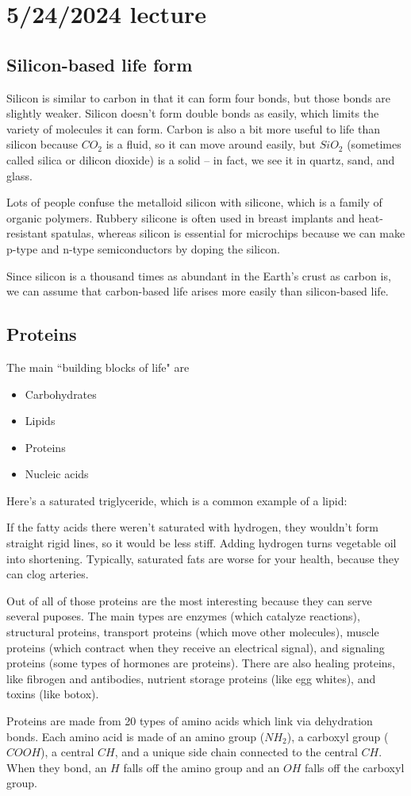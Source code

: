 \documentclass[class=article, crop=false]{standalone}
\begin{document}
\section{5/24/2024 lecture}
\subsection{Silicon-based life form}
Silicon is similar to carbon in that it can form four bonds, but those bonds are slightly weaker. Silicon doesn't form double bonds as easily, which limits the variety of molecules it can form. Carbon is also a bit more useful to life than silicon because $CO_2$ is a fluid, so it can move around easily, but $SiO_2$ (sometimes called silica or dilicon dioxide) is a solid -- in fact, we see it in quartz, sand, and glass.
\begin{note}
    Lots of people confuse the metalloid silicon with silicone, which is a family of organic polymers. Rubbery silicone is often used in breast implants and heat-resistant spatulas, whereas silicon is essential for microchips because we can make p-type and n-type semiconductors by doping the silicon.
\end{note}
\par
Since silicon is a thousand times as abundant in the Earth's crust as carbon is, we can assume that carbon-based life arises more easily than silicon-based life.
\subsection{Proteins}
The main ``building blocks of life" are
\begin{itemize}
    \item Carbohydrates
    \item Lipids
    \item Proteins
    \item Nucleic acids
\end{itemize}
Here's a saturated triglyceride, which is a common example of a lipid:
\begin{note}
    If the fatty acids there weren't saturated with hydrogen, they wouldn't form straight rigid lines, so it would be less stiff. Adding hydrogen turns vegetable oil into shortening. Typically, saturated fats are worse for your health, because they can clog arteries.
\end{note}
Out of all of those proteins are the most interesting because they can serve several puposes. The main types are enzymes (which catalyze reactions), structural proteins, transport proteins (which move other molecules), muscle proteins (which contract when they receive an electrical signal), and signaling proteins (some types of hormones are proteins). There are also healing proteins, like fibrogen and antibodies, nutrient storage proteins (like egg whites), and toxins (like botox).
\par
Proteins are made from 20 types of amino acids which link via dehydration bonds. Each amino acid is made of an amino group ($NH_2$), a carboxyl group ($COOH$), a central $CH$, and a unique side chain connected to the central $CH$. When they bond, an $H$ falls off the amino group and an $OH$ falls off the carboxyl group.
\end{document}
